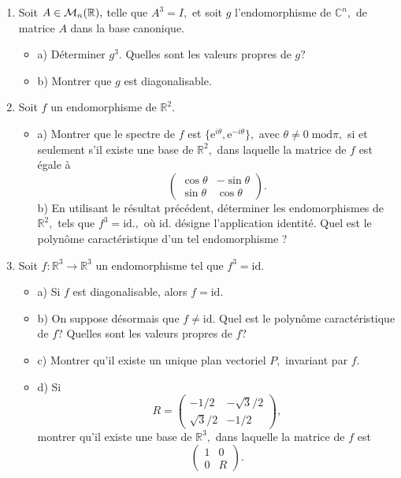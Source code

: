\documentclass[12pt,a4paper]{article}
\begin{document}
\begin{enumerate}
\item Soit $A\in {\cal M}_n(\mathbb R),$ telle que $A^3=I,$ et soit
  $g$ l'endomorphisme de $\mathbb C^n,$ de matrice $A$ dans la base
  canonique.
\begin{itemize}
\item a) Déterminer $g^3.$ Quelles sont les valeurs propres de $g ?$
\item b) Montrer que $g$ est diagonalisable.
\end{itemize}
\item Soit $f$ un endomorphisme de $\mathbb R^2.$
\begin{itemize}
\item a) Montrer que le spectre de $f$ est $\{\mbox{e}^{i\theta},
  \mbox{e}^{-i\theta}\},$ avec $\theta\neq 0 \;\mbox{mod}\pi,$ si et seulement s'il existe une base de
  $\mathbb R^2,$ dans laquelle la matrice de $f$ est égale à 
$$
\left(\begin{array}{cc}\cos\theta&-\sin\theta\\\sin\theta&\cos\theta\end{array}\right).$$
b) En utilisant le résultat précédent, déterminer les endomorphismes
de $\mathbb R^2,$ tels que $f^3= \mbox{id}.,$ où id. désigne
l'application identité. Quel est le polynôme caractéristique d'un tel
endomorphisme ?
\end{itemize}
\item Soit $f:\mathbb R^3\rightarrow\mathbb R^3$ un endomorphisme tel
  que $f^3= \mbox{id}.$
\begin{itemize}
\item a) Si $f$ est diagonalisable, alors $f=\mbox{id}.$ 
\item b) On suppose désormais que $f\neq\mbox{id}.$ Quel est le
  polynôme caractéristique de $f ?$ Quelles sont les valeurs propres
  de $f ?$
\item c) Montrer qu'il existe un unique plan vectoriel $P,$ invariant
  par $f.$ 
\item d) Si $$ R=\left(\begin{array}{cc}-1/2&-\sqrt 3/2\\\sqrt
      3/2&-1/2\end{array}\right),$$ montrer qu'il existe une base de
  $\mathbb R^3,$ dans laquelle la matrice de $f$ est
$$\left(\begin{array}{cc}1&0\\0&R \end{array}\right).$$
\end{itemize} 

\end{enumerate}
\end{document}
